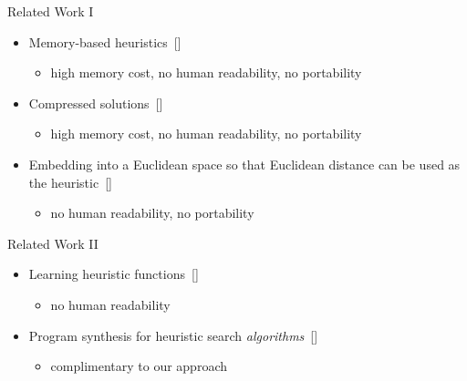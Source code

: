 \documentclass[aspectratio=169,usenames,dvipsnames]{beamer}
\newcommand{\tcb}[1]{\textcolor{m1}{#1}}
\newcommand{\tcm}[1]{\textcolor{m7}{#1}}
\newcommand{\bei}{\begin{itemize}}
\newcommand{\eei}{\end{itemize}}
\newcommand{\ie}{\item}
\numberwithin{equation}{section}
\numberwithin{theorem}{section}
\numberwithin{lem}{section}
\numberwithin{df}{section}
\begin{document}

\begin{frame}{Related Work I}

\bei

\ie Memory-based heuristics~[\cite{PDB,felner2007compressed,conf/aiide/BjornssonH06,conf/ijcai/SturtevantFBSB09}]
\bei
\ie \tcm{high memory cost, no human readability, no portability}
\eei

\medskip

\ie Compressed solutions~[\cite{botea2011ultra,botea2013path}]
\bei
\ie \tcm{high memory cost, no human readability, no portability}
\eei

\medskip

\ie Embedding into a Euclidean space so that Euclidean distance can be used as the heuristic~[\cite{rayner2011euclidean,cohenfastmap}]
\bei
\ie \tcm{no human readability, no portability}
\eei

\eei

\end{frame}


\begin{frame}{Related Work II}

\bei



\ie Learning heuristic functions~[\cite{samadi2008learningFrom,biss_aij,agostinelli2019rubik,orseauL21}]
\bei
\ie \tcm{no human readability}
\eei

\bigskip

\ie Program synthesis for heuristic search {\em algorithms}~[\cite{bulitkoAlife2016,bulitkoSoCSalife2016}]
\bei
\ie \tcb{complimentary to our approach}
\eei

\eei

\end{frame}

\end{document}
